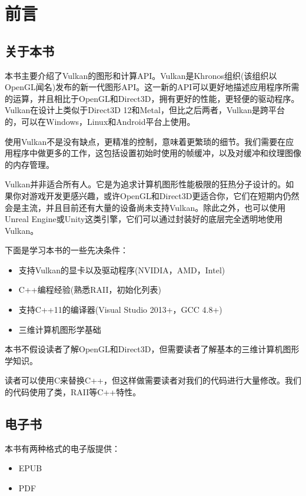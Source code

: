 \section{前言}
\subsection{关于本书}
本书主要介绍了Vulkan的图形和计算API。Vulkan是Khronos组织(该组织以OpenGL闻名)发布的新一代图形API。这一新的API可以更好地描述应用程序所需的运算，并且相比于OpenGL和Direct3D，拥有更好的性能，更轻便的驱动程序。Vulkan在设计上类似于Direct3D 12和Metal，但比之后两者，Vulkan是跨平台的，可以在Windows，Linux和Android平台上使用。

使用Vulkan不是没有缺点，更精准的控制，意味着更繁琐的细节。我们需要在应用程序中做更多的工作，这包括设置初始时使用的帧缓冲，以及对缓冲和纹理图像的内存管理。

Vulkan并非适合所有人。它是为追求计算机图形性能极限的狂热分子设计的。如果你对游戏开发更感兴趣，或许OpenGL和Direct3D更适合你，它们在短期内仍然会是主流，并且目前还有大量的设备尚未支持Vulkan。除此之外，也可以使用Unreal Engine或Unity这类引擎，它们可以通过封装好的底层完全透明地使用Vulkan。

下面是学习本书的一些先决条件：

\begin{itemize}
	\item 支持Vulkan的显卡以及驱动程序(NVIDIA，AMD，Intel)
	\item C++编程经验(熟悉RAII，初始化列表)
	\item 支持C++11的编译器(Visual Studio 2013+，GCC 4.8+)
	\item 三维计算机图形学基础
\end{itemize}


本书不假设读者了解OpenGL和Direct3D，但需要读者了解基本的三维计算机图形学知识。

读者可以使用C来替换C++，但这样做需要读者对我们的代码进行大量修改。我们的代码使用了类，RAII等C++特性。

\subsection{电子书}

本书有两种格式的电子版提供：

\begin{itemize}
	\item EPUB
	\item PDF
\end{itemize}


